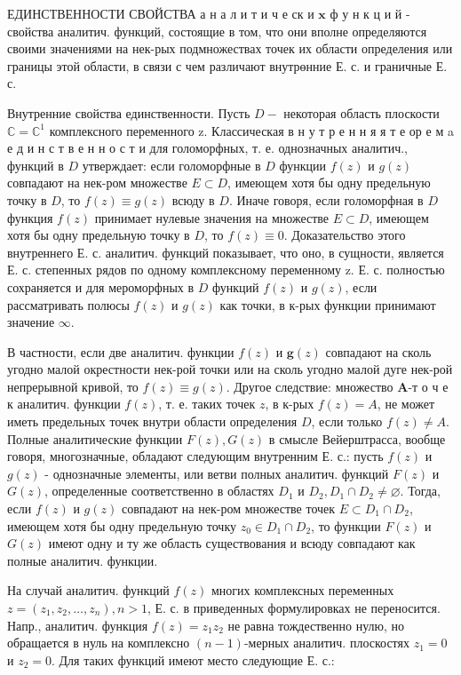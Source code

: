 \documentclass[10pt]{article}
\begin{document}
ЕДИНСТВЕННОСТИ СВОЙСТВА а н а л и т и ч е ск и $\mathbf{x}$ ф у н к ц и й - свойства аналитич. функций, состоящие в том, что они вполне определяются своими значениями на нек-рых подмножествах точек их области определения или границы этой области, в связи с чем различают внутрөнние Е. с. и граничные Е. с.



Внутренние свойства единственности. Пусть $D-$ некоторая область плоскости $\mathbb{C}=\mathbb{C}^{1}$ комплексного переменного z. Классическая в н у т р е н н я я т е ор е м a е д и н с т в е н н о с т и для голоморфных, т. е. однозначных аналитич., функций в $D$ утверждает: если голоморфные в $D$ функции $f(z)$ и $g(z)$ совпадают на нек-ром множестве $E \subset D$, имеющем хотя бы одну предельную точку в $D$, то $f(z) \equiv g(z)$ всюду в $D$. Иначе говоря, если голоморфная в $D$ функция $f(z)$ принимает нулевые значения на множестве $E \subset D$, имеющем хотя бы одну предельную точку в $D$, то $f(z) \equiv 0$. Доказательство этого внутреннего Е. с. аналитич. функций показывает, что оно, в сущности, является Е. с. степенных рядов по одному комплексному переменному z. Е. с. полностью сохраняется и для мероморфных в $D$ функций $f(z)$ и $g(z)$, если рассматривать полюсы $f(z)$ и $g(z)$ как точки, в к-рых функции принимают значение $\infty$.



В частности, если две аналитич. функции $f(z)$ и $\boldsymbol{g}(z)$ совпадают на сколь угодно малой окрестности нек-рой точки или на сколь угодно малой дуге нек-рой непрерывной кривой, то $f(z) \equiv g(z)$. Другое следствие: множество $\boldsymbol{A}$-т о ч е к аналитич. функции $f(z)$, т. е. таких точек $z$, в к-рых $f(z)=A$, не может иметь предельных точек внутри области определения $D$, если только $f(z) \neq A$. Полные аналитические функции $F(z), G(z)$ в смысле Вейерштрасса, вообще говоря, многозначные, обладают следующим внутренним Е. с.: пусть $f(z)$ и $g(z)$ - однозначные элементы, или ветви полных аналитич. функций $F(z)$ и $G(z)$, определенные соответственно в областях $D_{1}$ и $D_{2}, D_{1} \cap D_{2} \neq \varnothing$. Тогда, если $f(z)$ и $g(z)$ совпадают на нек-ром множестве точек $E \subset D_{1} \cap D_{2}$, имеющем хотя бы одну предельную точку $z_{0} \in D_{1} \cap D_{2}$, то функции $F(z)$ и $G(z)$ имеют одну и ту же область существования и всюду совпадают как полные аналитич. функции.



На случай аналитич. функций $f(z)$ многих комплексных переменных $z=\left(z_{1}, z_{2}, \ldots, z_{n}\right), n>1$, Е. с. в приведенных формулировках не переносится. Напр., аналитич. функция $f(z)=z_{1} z_{2}$ не равна тождественно нулю, но обращается в нуль на комплексно $(n-1)$-мерных аналитич. плоскостях $z_{1}=0$ и $z_{2}=0$. Для таких функций имеют место следующие Е. с.:
\end{document}
